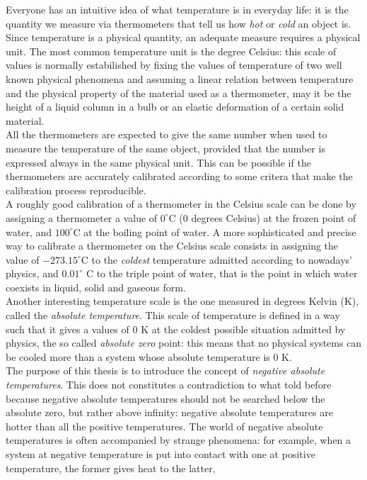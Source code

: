 Everyone has an intuitive idea of what temperature is in everyday life: it is the quantity we measure via thermometers that tell us how \emph{hot} or \emph{cold} an object is. \\
Since temperature is a physical quantity, an adequate measure requires a physical unit. The most common temperature unit is the degree Celsius: this scale of values is normally estabilished by fixing the values of temperature of two well known
physical phenomena and assuming a linear relation between temperature and the physical property of the material used as a thermometer, may it be the height of a liquid column in a bulb or an elastic deformation of a certain solid material. \\
All the thermometers are expected to give the same number when used to measure the temperature of the same object, provided that 
the number is expressed always in the same physical unit. This can be possible if the thermometers are accurately calibrated according to some critera that make the calibration process reproducible. \\
A roughly good calibration of a thermometer in the Celsius scale can be done by assigning a thermometer a value of $0^\circ$C (0 degrees Celsius) at the frozen point of water, and $100^\circ$C at the boiling point of water. A more sophisticated and precise way to calibrate a thermometer 
on the Celsius scale consists in assigning the value of $-273.15^\circ$C to the \emph{coldest} temperature admitted according to nowadays' physics, and $0.01^\circ$ C to the triple point of water, that 
is the point in which water coexists in liquid, solid and gaseous form. \\
Another interesting temperature scale is the one measured in degrees Kelvin (K), called the \emph{absolute temperature}. This scale of temperature is 
defined in a way such that it gives a values of $0$ K at the coldest possible situation admitted by physics, the so called \emph{absolute zero} point: this means that no physical systems can be cooled more than a system 
whose absolute temperature is $0$ K. \\
The purpose of this thesis is to introduce the concept of \emph{negative absolute temperatures}. This does not constitutes a contradiction to what told before because negative absolute temperatures should not be searched below the absolute zero, but rather 
above infinity: negative absolute temperatures are hotter than all the positive temperatures. The world of negative absolute temperatures is often accompanied by strange phenomena: for example, when a system at negative temperature is put into contact with one at positive temperature, the former gives heat to the latter,
